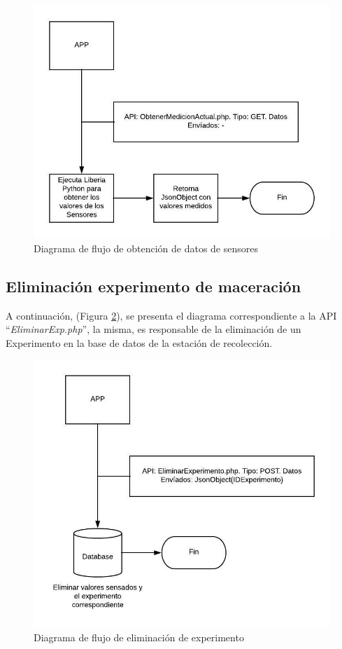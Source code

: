             \begin{figure}[htb]
                \centering
                \includegraphics{DiagramaGetTempPh.jpeg}
                \caption{Diagrama de flujo de obtención de datos de sensores}
                \label{fig:ApiGetTempPh}
            \end{figure}
        
        \subsection{Eliminación experimento de maceración}
        \par A continuación, (Figura \ref{fig:ApiRemoveExp}), se presenta el diagrama correspondiente a la API ``\textit{EliminarExp.php}'', la misma, es responsable de la eliminación de un Experimento en la base de datos de la estación de recolección.
            \begin{figure} [htb]
                \centering
                \includegraphics{DiagramaRemoveExp.jpeg}
                \caption{Diagrama de flujo de eliminación de experimento}
                \label{fig:ApiRemoveExp}
            \end{figure}
            
